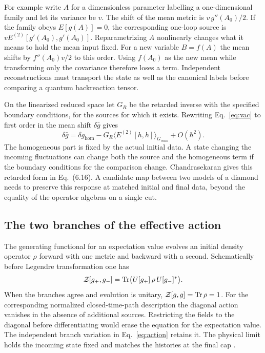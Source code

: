 \documentclass[11pt,letterpaper]{article}
\begin{document}
For example write \(A\) for a dimensionless parameter labelling a
one-dimensional family and let its variance be \(v\). The shift of
the mean metric is \(v\,g''(A_0)/2\). If the family obeys
\(E[g(A)]=0\), the corresponding one-loop source is
\(v E^{(2)}[g'(A_0),g'(A_0)]\). Reparametrizing \(A\) nonlinearly
changes what it means to hold the mean input fixed. For a new variable
\(B=f(A)\) the mean shifts by \(f''(A_0)v/2\) to this order.
Using \(f(A_0)\) as the new mean while transforming only the covariance
therefore loses a term. Independent reconstructions must transport
the state as well as the canonical labels before comparing a quantum
backreaction tensor.

On the linearized reduced space let \(G_R\) be the retarded inverse
with the specified boundary conditions, for the sources for which it
exists. Rewriting Eq.~\eqref{eq:vac} to first order in the mean shift
\(\delta\bar g\) gives
\begin{equation}
 \delta\bar g=\delta g_{\mathrm{hom}}
    -G_R\langle E^{(2)}[h,h]\rangle_{G_{\mathrm{conn}}}
    + O(\hbar^2).
 \label{eq:retarded}
\end{equation}
The homogeneous part is fixed by the actual initial data. A state
changing the incoming fluctuations can change both the source and the
homogeneous term if the boundary conditions for the comparison change.
Chandrasekaran gives this retarded form in Eq.~(6.16).
A candidate map between two models of a diamond needs to preserve this
response at matched initial and final data, beyond the equality of the
operator algebras on a single cut.

\subsection{The two branches of the effective action}
The generating functional for an expectation value evolves an initial
density operator \(\rho\) forward with one metric and backward with a
second. Schematically before Legendre transformation one has
\[
 {\cal Z}[g_+,g_-]=
 \operatorname{Tr}\bigl(U[g_+]\,\rho\,U[g_-]^*\bigr).
\]
When the branches agree and evolution is unitary,
\({\cal Z}[g,g]=\operatorname{Tr}\rho=1\). For the corresponding
normalized closed-time-path description the diagonal action vanishes
in the absence of additional sources. Restricting the fields to the
diagonal before differentiating would erase the equation for the
expectation value. The independent branch variation in
Eq.~\eqref{eq:action} retains it. The physical limit holds the incoming
state fixed and matches the histories at the final cap
\cite{jordan,ctp}.
\end{document}
